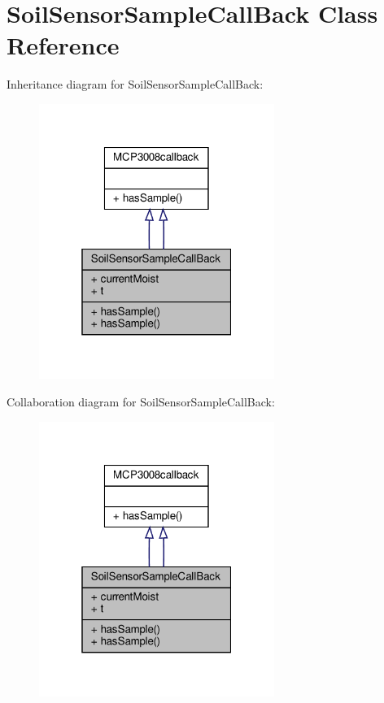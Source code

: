 \hypertarget{classSoilSensorSampleCallBack}{}\section{Soil\+Sensor\+Sample\+Call\+Back Class Reference}
\label{classSoilSensorSampleCallBack}


Inheritance diagram for Soil\+Sensor\+Sample\+Call\+Back\+:
\nopagebreak
\begin{figure}[H]
\begin{center}
\leavevmode
\includegraphics[width=217pt]{classSoilSensorSampleCallBack__inherit__graph}
\end{center}
\end{figure}


Collaboration diagram for Soil\+Sensor\+Sample\+Call\+Back\+:
\nopagebreak
\begin{figure}[H]
\begin{center}
\leavevmode
\includegraphics[width=217pt]{classSoilSensorSampleCallBack__coll__graph}
\end{center}
\end{figure}
